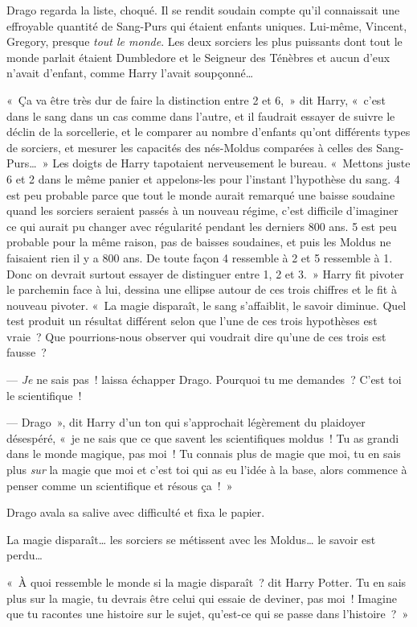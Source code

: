 Drago regarda la liste, choqué.
Il se rendit soudain compte qu'il connaissait une effroyable quantité de Sang-Purs qui étaient enfants uniques.
Lui-même, Vincent, Gregory, presque \emph{tout le monde}.
Les deux sorciers les plus puissants dont tout le monde parlait étaient Dumbledore et le Seigneur des Ténèbres et aucun d'eux n'avait d'enfant, comme Harry l'avait soupçonné…

«~Ça va être très dur de faire la distinction entre 2 et 6,~» dit Harry, «~c'est dans le sang dans un cas comme dans l'autre, et il faudrait essayer de suivre le déclin de la sorcellerie, et le comparer au nombre d'enfants qu'ont différents types de sorciers, et mesurer les capacités des nés-Moldus comparées à celles des Sang-Purs…~»
Les doigts de Harry tapotaient nerveusement le bureau.
«~Mettons juste 6 et 2 dans le même panier et appelons-les pour l'instant l'hypothèse du sang.
4 est peu probable parce que tout le monde aurait remarqué une baisse soudaine quand les sorciers seraient passés à un nouveau régime, c'est difficile d'imaginer ce qui aurait pu changer avec régularité pendant les derniers 800 ans.
5 est peu probable pour la même raison, pas de baisses soudaines, et puis les Moldus ne faisaient rien il y a 800 ans.
De toute façon 4 ressemble à 2 et 5 ressemble à 1.
Donc on devrait surtout essayer de distinguer entre 1, 2 et 3.~»
Harry fit pivoter le parchemin face à lui, dessina une ellipse autour de ces trois chiffres et le fit à nouveau pivoter.
«~La magie disparaît, le sang s'affaiblit, le savoir diminue.
Quel test produit un résultat différent selon que l'une de ces trois hypothèses est vraie~?
Que pourrions-nous observer qui voudrait dire qu'une de ces trois est fausse~?

--- \emph{Je} ne sais pas~! laissa échapper Drago.
Pourquoi tu me demandes~?
C'est toi le scientifique~!

--- Drago~», dit Harry d'un ton qui s'approchait légèrement du plaidoyer désespéré, «~je ne sais que ce que savent les scientifiques moldus~!
Tu as grandi dans le monde magique, pas moi~!
Tu connais plus de magie que moi, tu en sais plus \emph{sur} la magie que moi et c'est toi qui as eu l'idée à la base, alors commence à penser comme un scientifique et résous ça~!~»

Drago avala sa salive avec difficulté et fixa le papier.

La magie disparaît… les sorciers se métissent avec les Moldus… le savoir est perdu…

«~À quoi ressemble le monde si la magie disparaît~? dit Harry Potter.
Tu en sais plus sur la magie, tu devrais être celui qui essaie de deviner, pas moi~!
Imagine que tu racontes une histoire sur le sujet, qu'est-ce qui se passe dans l'histoire~?~»

